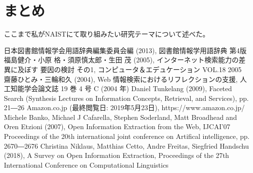 \documentclass[a4j,10pt, twocolumn]{jarticle}
\begin{document}
\section{まとめ}
ここまで私がNAISTにて取り組みたい研究テーマについて述べた。

\begin{thebibliography}{9}
  日本図書館情報学会用語辞典編集委員会編 (2013), 図書館情報学用語辞典 第4版
   福島健介・小原 格・須原慎太郎・生田 茂 (2005), インターネット検索能力の差異に及ぼす 要因の検討 その1, コンピュータ＆エデュケーション VOL.18 2005
   齋藤ひとみ・三輪和久 (2004),  Web 情報検索におけるリフレクションの支援, 人工知能学会論文誌 19 巻 4 号 C (2004 年)
  Daniel Tunkelang (2009), Faceted Search (Synthesis Lectures on Information Concepts, Retrieval, and Services), pp. 21―26
  Amazon.co.jp (最終閲覧日: 2019年5月23日), https://www.amazon.co.jp/
  Michele Banko, Michael J Cafarella, Stephen Soderland, Matt Broadhead and Oren Etzioni (2007), Open Information Extraction from the Web, IJCAI'07 Proceedings of the 20th international joint conference on Artifical intelligence, pp. 2670―2676 
  Christina Niklaus, Matthias Cetto, Andre Freitas, Siegfried Handschu (2018), A Survey on Open Information Extraction, Proceedings of the 27th International Conference on Computational Linguistics
\end{thebibliography}
\end{document}
